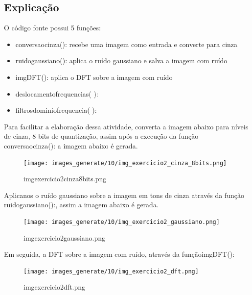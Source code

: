\documentclass[10pt,a4paper]{article}
\begin{document}


\subsection{Explicação}

O código fonte possui 5 funções:

\begin{itemize}
    \item {\ttfamily conversao\textunderscore cinza():} recebe uma imagem como entrada e converte para cinza
    \item {\ttfamily ruido\textunderscore gaussiano():} aplica o ruído gaussiano e salva a imagem com ruído
    \item {\ttfamily img\textunderscore DFT():} aplica o DFT sobre a imagem com ruído
    \item {\ttfamily deslocamento\textunderscore frequencias( ):}
    \item {\ttfamily filtros\textunderscore dominio\textunderscore frequencia( ):} 
\end{itemize}

Para facilitar a elaboração dessa atividade, converta a imagem abaixo para níveis de cinza, 8 bits de quantização, assim após a execução da função {\ttfamily conversao\textunderscore cinza():}  a imagem abaixo é gerada.

\begin{figure}[H]
    \centering
    \texttt{[image: images\_generate/10/img\_exercicio2\_cinza\_8bits.png]}
    \caption{img\textunderscore exercicio2\textunderscore cinza\textunderscore 8bits.png}
\end{figure}

Aplicanos o ruído gaussiano sobre a imagem em tons de cinza através da função {\ttfamily ruido\textunderscore gaussiano():}, assim a imagem abaixo é gerada.

\begin{figure}[H]
    \centering
    \texttt{[image: images\_generate/10/img\_exercicio2\_gaussiano.png]}
    \caption{img\textunderscore exercicio2\textunderscore gaussiano.png}
\end{figure}

Em seguida, a DFT sobre a imagem com ruído, através da função{\ttfamily img\textunderscore DFT():}

\begin{figure}[H]
    \centering
    \texttt{[image: images\_generate/10/img\_exercicio2\_dft.png]}
    \caption{img\textunderscore exercicio2\textunderscore dft.png}
\end{figure}
\end{document}
